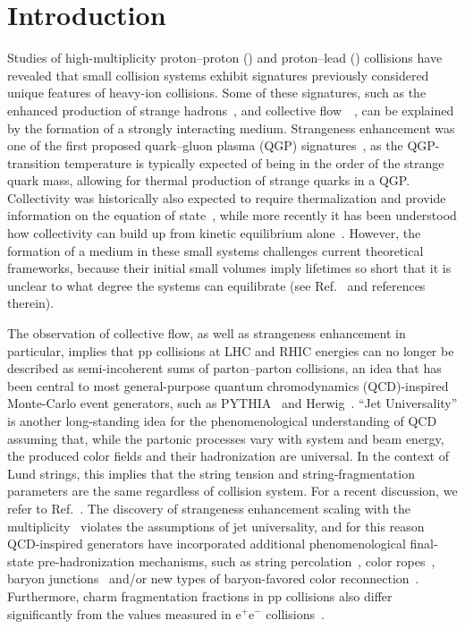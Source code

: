 \section{Introduction}
Studies of high-multiplicity proton--proton (\pp) and proton--lead (\pPb) collisions have revealed that small collision systems exhibit signatures previously considered unique features of heavy-ion collisions. Some of these signatures, such as the enhanced production of strange hadrons~\cite{Naturepaper}, and collective flow~\cite{Ref:Flow1}~\cite{Ref:Flow2}, can be explained by the formation of a strongly interacting medium. Strangeness enhancement was one of the first proposed quark--gluon plasma (QGP) signatures~\cite{Koch:1986ud}, as the QGP-transition temperature is typically expected of being in the order of the strange quark mass, allowing for thermal production of strange quarks in a QGP. Collectivity was historically also expected to require thermalization and provide information on the equation of state~\cite{Teaney:2000cw}, while more recently it has been understood how collectivity can build up from kinetic equilibrium alone~\cite{Kurkela:2018xxd}. However, the formation of a medium in these small systems challenges current theoretical frameworks, because their initial small volumes imply lifetimes so short that it is unclear to what degree the systems can equilibrate (see Ref.~\cite{Kurkela:2018xxd} and references therein).

The observation of collective flow, as well as strangeness enhancement in particular, implies that pp collisions at LHC and RHIC energies can no longer be described as semi-incoherent sums of parton--parton collisions, an idea that has been central to most general-purpose quantum chromodynamics (QCD)-inspired Monte-Carlo event generators, such as PYTHIA~\cite{Sjostrand:2007gs} and Herwig~\cite{Herwig}. “Jet Universality'' is another long-standing idea for the phenomenological understanding of QCD assuming that, while the partonic processes vary with system and beam energy, the produced color fields and their hadronization are universal. In the context of Lund strings, this implies that the string tension and string-fragmentation parameters are the same regardless of collision system. For a recent discussion, we refer to Ref.~\cite{Torbjorn}. The discovery of strangeness enhancement scaling with the multiplicity~\cite{alice_newstrangeness}\cite{ALICE:2020nkc} violates the assumptions of jet universality, and for this reason QCD-inspired generators have incorporated additional phenomenological final-state pre-hadronization mechanisms, such as string percolation~\cite{Ref:SPerc}, color ropes~\cite{Ropes}, baryon junctions~\cite{Junctions} and/or new types of baryon-favored color reconnection~\cite{HerwigStrange}. Furthermore, charm fragmentation fractions in pp collisions also differ significantly from the values measured in $\textrm{e}^+\textrm{e}^-$ collisions~\cite{ALICE:2021dhb}. 


